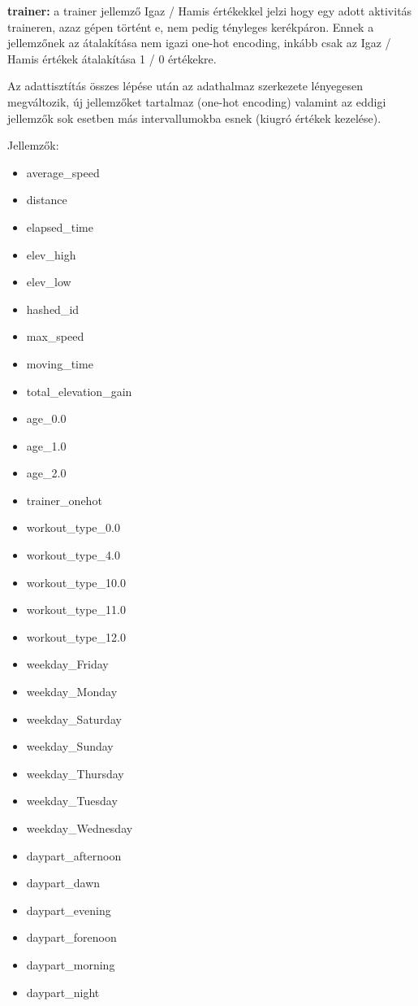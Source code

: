 \textbf{trainer: } a trainer jellemző Igaz / Hamis értékekkel jelzi hogy egy adott aktivitás traineren, azaz gépen történt e, nem pedig tényleges kerékpáron. Ennek a jellemzőnek az átalakítása nem igazi one-hot encoding, inkább csak az Igaz / Hamis értékek átalakítása 1 / 0 értékekre.  


Az adattisztítás összes lépése után az adathalmaz szerkezete lényegesen megváltozik, új jellemzőket tartalmaz (one-hot encoding) valamint az eddigi jellemzők sok esetben más intervallumokba esnek (kiugró értékek kezelése).

Jellemzők:
\begin{itemize}
	\item average\_speed
	\item distance
	\item elapsed\_time
	\item elev\_high
	\item elev\_low
	
	\item hashed\_id 
	\item max\_speed
	\item moving\_time
	\item total\_elevation\_gain
	\item age\_0.0 
	\item age\_1.0
	\item age\_2.0
	\item trainer\_onehot
	\item workout\_type\_0.0
	\item workout\_type\_4.0 
	\item workout\_type\_10.0 
	\item workout\_type\_11.0
	\item workout\_type\_12.0
	\item weekday\_Friday 
	\item weekday\_Monday
	\item weekday\_Saturday 
	\item weekday\_Sunday 
	\item weekday\_Thursday
	\item weekday\_Tuesday
	\item weekday\_Wednesday 
	\item daypart\_afternoon
	\item daypart\_dawn
	\item daypart\_evening
	\item daypart\_forenoon
	\item daypart\_morning
	\item daypart\_night
\end{itemize}


